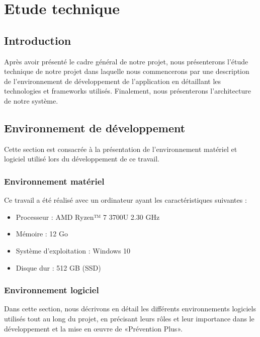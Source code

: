 \chapter{Etude technique}
\usetikzlibrary{positioning} 
\usetikzlibrary{calc} 
\begin{spacing}{1.2}
\minitoc
\thispagestyle{MyStyle}
\end{spacing}
\newpage

\section*{Introduction}

\noindent Après avoir présenté le cadre général de notre projet, nous présenterons l'étude technique de notre projet dans laquelle nous commencerons par une description de l'environnement de développement de l'application en détaillant les technologies et frameworks utilisés. Finalement, nous présenterons l'architecture de notre système.

\section{Environnement de développement}

\noindent Cette section est consacrée à la présentation de l'environnement matériel et logiciel utilisé lors du développement de ce travail.

\subsection{Environnement matériel}

\noindent Ce travail a été réalisé avec un ordinateur ayant les caractéristiques suivantes :
\begin{itemize}
    \item Processeur : AMD Ryzen™ 7 3700U 2.30 GHz
    \item Mémoire : 12 Go
    \item Système d'exploitation : Windows 10
    \item Disque dur : 512 GB (SSD)
\end{itemize}

\subsection{Environnement logiciel}

\noindent Dans cette section, nous décrivons en détail les différents environnements logiciels utilisés tout au long du projet, en précisant leurs rôles et leur importance dans le développement et la mise en œuvre de «Prévention Plus».
